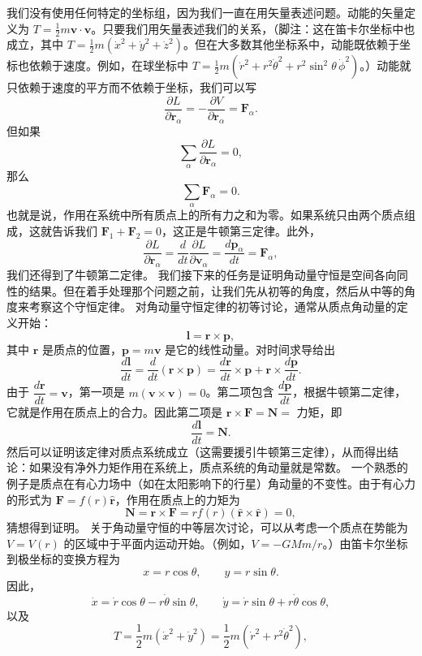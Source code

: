 我们没有使用任何特定的坐标组，因为我们一直在用矢量表述问题。动能的矢量定义为 $T = \frac{1}{2}m\mathbf{v}\cdot\mathbf{v}$。只要我们用矢量表述我们的关系，（脚注：这在笛卡尔坐标中也成立，其中 $T = \frac{1}{2}m\left(\dot{x}^2 + \dot{y}^2 + \dot{z}^2\right)$。但在大多数其他坐标系中，动能既依赖于坐标也依赖于速度。例如，在球坐标中 $T = \frac{1}{2}m(\dot{r}^2 + r^2\dot{\theta}^2 + r^2\sin^2\theta\,\dot{\phi}^2)$。）动能就只依赖于速度的平方而不依赖于坐标，我们可以写
\[
\frac{\partial L}{\partial \mathbf{r}_\alpha} = -\frac{\partial V}{\partial \mathbf{r}_\alpha} = \mathbf{F}_\alpha.
\]
但如果
\[
\sum_{\alpha}\frac{\partial L}{\partial \mathbf{r}_\alpha} = 0,
\]
那么
\[
\sum_{\alpha}\mathbf{F}_\alpha = 0.
\]
也就是说，作用在系统中所有质点上的所有力之和为零。如果系统只由两个质点组成，这就告诉我们 $\mathbf{F}_1 + \mathbf{F}_2 = 0$，这正是牛顿第三定律。此外，
\[
\frac{\partial L}{\partial \mathbf{r}_\alpha} = \frac{d}{dt}\frac{\partial L}{\partial \mathbf{v}_\alpha} = \frac{d\mathbf{p}_\alpha}{dt} = \mathbf{F}_\alpha,
\]
我们还得到了牛顿第二定律。
我们接下来的任务是证明角动量守恒是空间各向同性的结果。但在着手处理那个问题之前，让我们先从初等的角度，然后从中等的角度来考察这个守恒定律。
对角动量守恒定律的初等讨论，通常从质点角动量的定义开始：
\[
\mathbf{l} = \mathbf{r}\times\mathbf{p},
\]
其中 $\mathbf{r}$ 是质点的位置，$\mathbf{p} = m\mathbf{v}$ 是它的线性动量。对时间求导给出
\[
\frac{d\mathbf{l}}{dt} = \frac{d}{dt}(\mathbf{r}\times\mathbf{p}) = \frac{d\mathbf{r}}{dt}\times\mathbf{p} + \mathbf{r}\times\frac{d\mathbf{p}}{dt}.
\]
由于 $\dfrac{d\mathbf{r}}{dt} = \mathbf{v}$，第一项是 $m(\mathbf{v}\times\mathbf{v}) = 0$。第二项包含 $\dfrac{d\mathbf{p}}{dt}$，根据牛顿第二定律，它就是作用在质点上的合力。因此第二项是 $\mathbf{r}\times\mathbf{F} = \mathbf{N} = $ 力矩，即
\[
\frac{d\mathbf{l}}{dt} = \mathbf{N}.
\]
然后可以证明该定律对质点系统成立（这需要援引牛顿第三定律），从而得出结论：如果没有净外力矩作用在系统上，质点系统的角动量就是常数。
一个熟悉的例子是质点在有心力场中（如在太阳影响下的行星）角动量的不变性。由于有心力的形式为 $\mathbf{F} = f(r)\hat{\mathbf{r}}$，作用在质点上的力矩为
\[
\mathbf{N} = \mathbf{r}\times\mathbf{F} = rf(r)(\hat{\mathbf{r}}\times\hat{\mathbf{r}}) = 0,
\]
猜想得到证明。
关于角动量守恒的中等层次讨论，可以从考虑一个质点在势能为 $V = V(r)$ 的区域中于平面内运动开始。（例如，$V = -GMm/r$。）由笛卡尔坐标到极坐标的变换方程为
\[
x = r\cos\theta, \qquad y = r\sin\theta.
\]
因此，
\[
\dot{x} = \dot{r}\cos\theta - r\dot{\theta}\sin\theta, \qquad \dot{y} = \dot{r}\sin\theta + r\dot{\theta}\cos\theta,
\]
以及
\[
T = \frac{1}{2}m\left(\dot{x}^2 + \dot{y}^2\right) = \frac{1}{2}m\left(\dot{r}^2 + r^2\dot{\theta}^2\right),
\]
